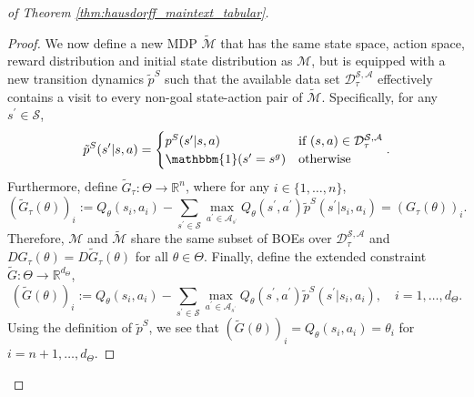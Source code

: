 \documentclass{amsart}
\begin{document}
\begin{proof}[of Theorem \ref{thm:hausdorff_maintext_tabular}]
\begin{proof}
 We now define a new MDP $\widetilde{\mathcal{M}}$ that has the same state space, action space, reward distribution and initial state distribution as $\mathcal{M}$, but is equipped with a new transition dynamics $\tilde{p}^S$ such that the available data set $\mathcal{D}_\tau^{\mathcal{S},\mathcal{A}}$ effectively contains a visit to every non-goal state-action pair of $\widetilde{\mathcal{M}}$. Specifically, for any $s^\prime \in \mathcal{S}$,
$$\tilde{p}^S(s^\prime|s,a) = \begin{cases} p^S(s^\prime|s,a) & \text{if }(s,a) \in \mathcal{D}_\tau^{\mathcal{S},\mathcal{A}} \\
\mathbbm{1}(s^\prime=s^g) & \text{otherwise} \end{cases}.$$ 
Furthermore, define $\widetilde{G}_\tau:\Theta \rightarrow \mathbb{R}^n$, where for any $i \in \{1,\dots,n\}$,
$$(\widetilde{G}_\tau(\theta))_i := Q_{\theta}(s_i,a_i) - \sum_{s^\prime \in \mathcal{S}} \max_{a^\prime \in \mathcal{A}_{s^\prime}} Q_\theta(s^\prime,a^\prime) \tilde{p}^S(s^\prime|s_i,a_i)=(G_\tau(\theta))_i.$$
Therefore, $\mathcal{M}$ and $\widetilde{\mathcal{M}}$ share the same subset of BOEs over $\mathcal{D}_\tau^{\mathcal{S},\mathcal{A}}$ and $DG_\tau(\theta) = D\widetilde{G}_\tau(\theta)$ for all $\theta \in \Theta$. Finally, define the extended constraint $\widetilde{G}:\Theta \rightarrow \mathbb{R}^{d_\Theta}$, 
$$(\widetilde{G}(\theta))_i:= Q_{\theta}(s_i,a_i) -\sum_{s^\prime \in \mathcal{S}} \max_{a^\prime \in \mathcal{A}_{s^\prime}} Q_\theta(s^\prime,a^\prime) \tilde{p}^S(s^\prime|s_i,a_i),\quad i=1,\ldots, d_\Theta.$$
Using the definition of $\tilde{p}^S$, we see that $(\widetilde{G}(\theta))_i = Q_{\theta}(s_i,a_i) = \theta_i$ for $i=n+1,\ldots, d_\Theta$.


\end{proof}
\end{proof}
\end{document}

